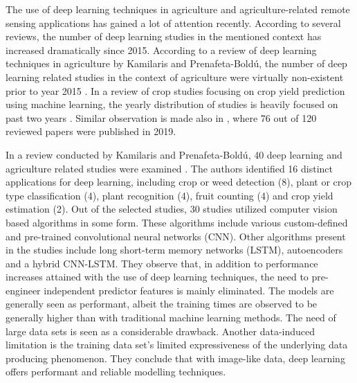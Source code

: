The use of deep learning techniques in agriculture and agriculture-related remote sensing applications has gained a lot of attention recently. According to several reviews, the number of deep learning studies in the mentioned context has increased dramatically since 2015. According to a review of deep learning techniques in agriculture by Kamilaris and Prenafeta-Bold{\'{u}}, the number of deep learning related studies in the context of agriculture were virtually non-existent prior to year 2015 \cite{Kamilaris2018a}. In a review of crop studies focusing on crop yield prediction using machine learning, the yearly distribution of studies is heavily focused on past two years \cite{VanKlompenburg2020}. Similar observation is made also in \cite{Unal2020}, where 76 out of 120 reviewed papers were published in 2019.

In a review conducted by Kamilaris and Prenafeta-Bold{\'{u}}, 40 deep learning and agriculture related studies were examined \cite{Kamilaris2018a}. The authors identified 16 distinct applications for deep learning, including crop or weed detection (8), plant or crop type classification (4), plant recognition (4), fruit counting (4) and crop yield estimation (2). Out of the selected studies, 30 studies utilized computer vision based algorithms in some form. These algorithms include various custom-defined and pre-trained convolutional neural networks (CNN). Other algorithms present in the studies include long short-term memory networks (LSTM), autoencoders and a hybrid CNN-LSTM. They observe that, in addition to performance increases attained with the use of deep learning techniques, the need to pre-engineer independent predictor features is mainly eliminated. The models are generally seen as performant, albeit the training times are observed to be generally higher than with traditional machine learning methods. The need of large data sets is seen as a considerable drawback. Another data-induced limitation is the training data set's limited expressiveness of the underlying data producing phenomenon. They conclude that with image-like data, deep learning offers performant and reliable modelling techniques.

